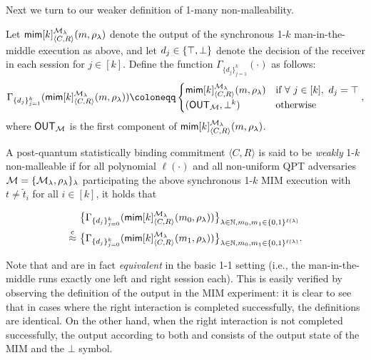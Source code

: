 Next we turn to our weaker definition of 1-many non-malleability. 

\begin{definition}\label{def:NMCom:weak:pq}
Let $\mathsf{mim}[k]^{\mathcal{M}_\lambda}_{\langle C, R \rangle}(m, \rho_\lambda)$ denote the output of the synchronous 1-$k$ man-in-the-middle execution as above, and let $d_j \in \{\top, \bot\}$ denote the decision of the receiver in each session for $j \in [k]$. Define the function $\Gamma_{\{d_j\}_{j=1}^{k}}(\cdot)$ as follows: 
$$\Gamma_{\{d_j\}_{j=1}^{k}}(\msf{mim}[k]^{\mcal{M}_\secpar}_{\langle C, R \rangle}(m, \rho_\secpar)) \coloneqq 
\begin{cases}
\msf{mim}[k]^{\mcal{M}_\secpar}_{\langle C, R \rangle}(m, \rho_\secpar) & \text{if}~\forall~j\in [k], ~d_j = \top \\
(\OUT_{\mcal{M}},\bot^k) & \text{otherwise}
\end{cases},
$$
where $\mathsf{OUT}_{\mathcal{M}}$ is the first component of $\mathsf{mim}[k]^{\mathcal{M}_\lambda}_{\langle C, R \rangle}(m, \rho_\lambda)$.


A post-quantum statistically binding commitment $\langle C, R \rangle$ is said to be {\em weakly} 1-$k$ non-malleable if for all polynomial $\ell(\cdot)$ and all non-uniform QPT adversaries $\mathcal{M} = \{\mathcal{M}_\lambda, \rho_\lambda\}_\lambda$ participating the above synchronous 1-$k$ MIM execution with $t \ne \tilde{t}_i$ for all $i \in [k]$, it holds that 

\begin{align*}
&\big\{\Gamma_{\{d_j\}_{j=0}^{k}}(\mathsf{mim}[k]^{\mathcal{M}_\lambda}_{\langle C, R \rangle}(m_0, \rho_\lambda))\big\}_{\lambda \in \mathbb{N}, m_0, m_1 \in \{0,1\}^{\ell(\lambda)}}\\
\stackrel{\text{c}}{\approx}~
&\big\{\Gamma_{\{d_j\}_{j=0}^{k}}(\mathsf{mim}[k]^{\mathcal{M}_\lambda}_{\langle C, R \rangle}(m_1, \rho_\lambda))\big\}_{\lambda \in \mathbb{N}, m_0, m_1 \in \{0,1\}^{\ell(\lambda)}}
.\end{align*}

\end{definition}

\begin{remark}
    Note that  and  are in fact {\em equivalent} in the basic 1-1 setting (i.e., the man-in-the-middle runs exactly one left and right session each). This is easily verified by observing the definition of the output in the MIM experiment: it is clear to see that in cases where the right interaction is completed successfully, the definitions are identical. On the other hand, when the right interaction is not completed successfully, the output according to both  and  consists of the output state of the MIM and the $\bot$ symbol. 
\end{remark}

